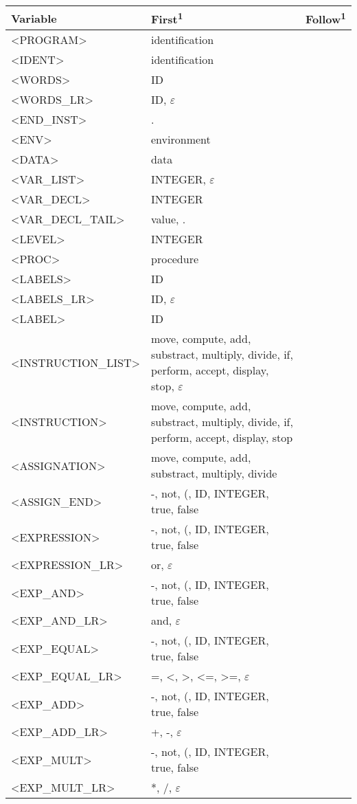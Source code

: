 \documentclass[a4paper,11pt]{article}
\begin{document}
\begin{longtable}{l>{\raggedright}p{6cm}p{6cm}}
	Variable & First\textsuperscript{1} & Follow\textsuperscript{1} \\ \hline
	<PROGRAM> & identification & \\
	<IDENT> & identification & \\
	<WORDS> & ID & \\
	<WORDS\_LR> & ID, $\varepsilon$ & \\
	<END\_INST> & . & \\
	<ENV> & environment & \\
	<DATA> & data & \\
	<VAR\_LIST> & INTEGER, $\varepsilon$ & \\
	<VAR\_DECL> & INTEGER & \\
	<VAR\_DECL\_TAIL> & value, . & \\
	<LEVEL> & INTEGER & \\
	<PROC> & procedure & \\
	<LABELS> & ID & \\
	<LABELS\_LR> & ID, $\varepsilon$ & \\
	<LABEL> & ID & \\
	<INSTRUCTION\_LIST> & move, compute, add, substract, multiply, divide, if, perform, accept, display, stop, $\varepsilon$ & \\
	<INSTRUCTION> & move, compute, add, substract, multiply, divide, if, perform, accept, display, stop & \\
	<ASSIGNATION> & move, compute, add, substract, multiply, divide & \\
	<ASSIGN\_END> & -, not, (, ID, INTEGER, true, false & \\
	<EXPRESSION> & -, not, (, ID, INTEGER, true, false & \\
	<EXPRESSION\_LR> & or, $\varepsilon$ & \\
	<EXP\_AND> & -, not, (, ID, INTEGER, true, false & \\
	<EXP\_AND\_LR> & and, $\varepsilon$ & \\
	<EXP\_EQUAL> & -, not, (, ID, INTEGER, true, false & \\
	<EXP\_EQUAL\_LR> & =, <, >, <=, >=, $\varepsilon$ & \\
	<EXP\_ADD> & -, not, (, ID, INTEGER, true, false & \\
	<EXP\_ADD\_LR> & +, -, $\varepsilon$ & \\
	<EXP\_MULT> & -, not, (, ID, INTEGER, true, false & \\
	<EXP\_MULT\_LR> & *, /, $\varepsilon$ & \\

\end{longtable}
\end{document}
